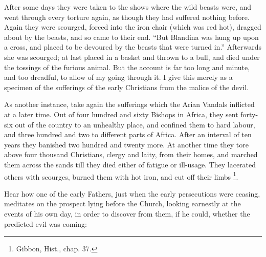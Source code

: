 After some days they were taken to the shows where the wild beasts
were, and went through every torture again, as though they had
suffered nothing before. Again they were scourged, forced into the
iron chair (which was red hot), dragged about by the beasts, and so
came to their end. ``But Blandina was hung up upon a cross, and
placed to be devoured by the beasts that were turned in.''
Afterwards she was scourged; at last placed in a basket and thrown to
a bull, and died under the tossings of the furious animal. But the
account is far too long and minute, and too dreadful, to allow of my
going through it. I give this merely as a specimen of the sufferings
of the early Christians from the malice of the devil.

As another instance, take again the sufferings which the Arian
Vandals inflicted at a later time. Out of four hundred and sixty
Bishops in Africa, they sent forty-six out of the country to an
unhealthy place, and confined them to hard labour, and three hundred
and two to different parts of Africa. After an interval of ten years
they banished two hundred and twenty more. At another time they tore
above four thousand Christians, clergy and laity, from their homes,
and marched them across the sands till they died either of fatigue or
ill-usage. They lacerated others with scourges, burned them with hot
iron, and cut off their limbs \footnote{Gibbon, Hist., chap. 37.}.

Hear how one of the early Fathers, just when the early persecutions
were ceasing, meditates on the prospect lying before the Church,
looking earnestly at the events of his own day, in order to discover
from them, if he could, whether the predicted evil was coming:

